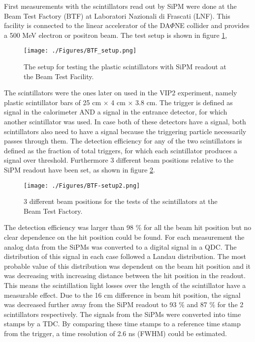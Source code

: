 First measurements with the scintillators read out by SiPM were done at the Beam Test Factory (BTF) at Laboratori Nazionali di Frascati (LNF). This facility is connected to the linear accelerator of the DA$\Phi$NE collider and provides a 500 MeV electron or positron beam. The test setup is shown in figure \ref{fig:btf_setup},
\begin{figure}[h]
 \centering
 \texttt{[image: ./Figures/BTF\_setup.png]}
 \caption{The setup for testing the plastic scintillators with SiPM readout at the Beam Test Facility.}
 \label{fig:btf_setup}
\end{figure}
The scintillators were the ones later on used in the VIP2 experiment, namely plastic scintillator bars of 25 cm $\times$ 4 cm $\times$ 3.8 cm. The trigger is defined as signal in the calorimeter AND a signal in the entrance detector, for which another scintillator was used. In case both of these detectors have a signal, both scintillators also need to have a signal because the triggering particle necessarily passes through them. The detection efficiency for any of the two scintillators is defined as the fraction of total triggers, for which each scintillator produces a signal over threshold. Furthermore 3 different beam positions relative to the SiPM readout have been set, as shown in figure \ref{fig:btf_setup2}.
\begin{figure}[h]
 \centering
 \texttt{[image: ./Figures/BTF-setup2.png]}
 \caption{3 different beam positions for the tests of the scintillators at the Beam Test Factory.}
 \label{fig:btf_setup2}
\end{figure}
The detection efficiency was larger than 98 \% for all the beam hit position but no clear dependence on the hit position could be found. For each measurement the analog data from the SiPMs was converted to a digital signal in a QDC. The distribution of this signal in each case followed a Landau distribution. The most probable value of this distribution was dependent on the beam hit position and it was decreasing with increasing distance between the hit position in the readout. This means the scintillation light losses over the length of the scintillator have a measurable effect. Due to the 16 cm difference in beam hit position, the signal was decreased further away from the SiPM readout to 93 \% and 87 \% for the 2 scintillators respectively. The signals from the SiPMs were converted into time stamps by a TDC. By comparing these time stamps to a reference time stamp from the trigger, a time resolution of 2.6 ns (FWHM) could be estimated.

